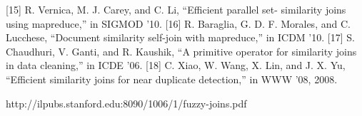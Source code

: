 [15] R. Vernica, M. J. Carey, and C. Li, “Efficient parallel set-
similarity joins using mapreduce,” in SIGMOD ’10.
[16] R. Baraglia, G. D. F. Morales, and C. Lucchese, “Document
similarity self-join with mapreduce,” in ICDM ’10.
[17] S. Chaudhuri, V. Ganti, and R. Kaushik, “A primitive operator
for similarity joins in data cleaning,” in ICDE ’06.
[18] C. Xiao, W. Wang, X. Lin, and J. X. Yu, “Efficient similarity
joins for near duplicate detection,” in WWW ’08, 2008.

http://ilpubs.stanford.edu:8090/1006/1/fuzzy-joins.pdf

